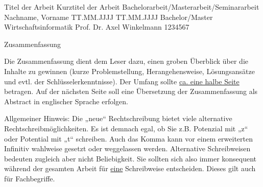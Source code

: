 \documentclass[12pt, oneside]{article}
\begin{document}
\titlespacing{\section}{0pt}{0pt}{0pt}
\titlespacing{\subsection}{0pt}{6pt}{0pt}
\titlespacing{\subsubsection}{0pt}{6pt}{0pt}

  \JMUTitle
      {Titel der Arbeit}                                %
      {Kurztitel der Arbeit}                            %
      {Bachelorarbeit/Masterarbeit/Seminararbeit}       %
      {Nachname, Vorname }                              %
      {TT.MM.JJJJ}                                      %
      {TT.MM.JJJJ}                                      %
      {Bachelor/Master Wirtschaftsinformatik}           %
      {Prof. Dr. Axel Winkelmann}                       %
      {1234567}                                         %


\newpage
{}

\Zusammenfassung
{Zusammenfassung}
{Die Zusammenfassung dient dem Leser dazu, einen groben Überblick über die Inhalte zu gewinnen (kurze Problemstellung, Herangehensweise, Lösungsansätze und evtl. der Schlüsselerkenntnisse). Der Umfang sollte \underline{ca. eine halbe Seite} betragen. Auf der nächsten Seite soll eine Übersetzung der Zusammenfassung als Abstract in englischer Sprache erfolgen.

Allgemeiner Hinweis: Die „neue“ Rechtschreibung bietet viele alternative Rechtschreibmöglichkeiten. Es ist demnach egal, ob Sie z.B. Potenzial mit „z“ oder Potential mit „t“ schreiben. Auch das Komma kann vor einem erweiterten Infinitiv wahlweise gesetzt oder weggelassen werden. Alternative Schreibweisen bedeuten zugleich aber nicht Beliebigkeit. Sie sollten sich also immer konsequent während der gesamten Arbeit für \underline{eine} Schreibweise entscheiden. Dieses gilt auch für Fachbegriffe.
}
\end{document}
